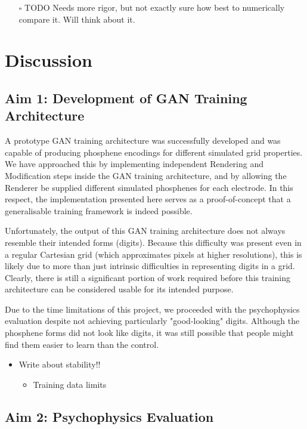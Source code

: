 \documentclass[a4paper,11pt,openany]{book}
\begin{document}
\begin{itemize}
\item[{$\square$}] TODO Needs more rigor, but not exactly sure how best to numerically compare it. Will think about it.
\end{itemize}

\part{Discussion}
\label{sec:org422953c}
\chapter{Aim 1: Development of GAN Training Architecture}
\label{sec:orga42ea3b}

A prototype GAN training architecture was successfully developed and was capable of producing phosphene encodings for different simulated grid properties.
We have approached this by implementing independent Rendering and Modification steps inside the GAN training architecture, and by allowing the Renderer be supplied different simulated phosphenes for each electrode.
In this respect, the implementation presented here serves as a proof-of-concept that a generalisable training framework is indeed possible.

Unfortunately, the output of this GAN training architecture does not always resemble their intended forms (digits).
Because this difficulty was present even in a regular Cartesian grid (which approximates pixels at higher resolutions), this is likely due to more than just intrinsic difficulties in representing digits in a grid.
Clearly, there is still a significant portion of work required before this training architecture can be considered usable for its intended purpose.

Due to the time limitations of this project, we proceeded with the psychophysics evaluation despite not achieving particularly "good-looking" digits.
Although the phosphene forms did not look like digits, it was still possible that people might find them easier to learn than the control.

\begin{itemize}
\item Write about stability!!
\begin{itemize}
\item Training data limits
\end{itemize}
\end{itemize}

\chapter{Aim 2: Psychophysics Evaluation}
\label{sec:org17fb1ea}
\end{document}
